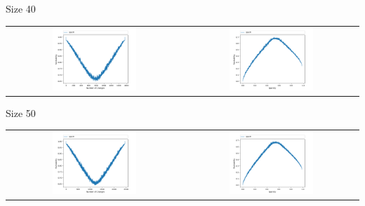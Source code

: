 \documentclass{beamer}
\begin{document}
\begin{frame}{Size 40}
\centering
\begin{tabular}{cc}
\includegraphics[width=0.5\textwidth]{figures/test_rand_pert_40.png}
&
\includegraphics[width=0.5\textwidth]{figures/test_sparse_40.png}
\end{tabular}
\end{frame}

\begin{frame}{Size 50}
\centering
\begin{tabular}{cc}
\includegraphics[width=0.5\textwidth]{figures/test_rand_pert_50.png}
&
\includegraphics[width=0.5\textwidth]{figures/test_sparse_50.png}
\end{tabular}
\end{frame}
\end{document}
